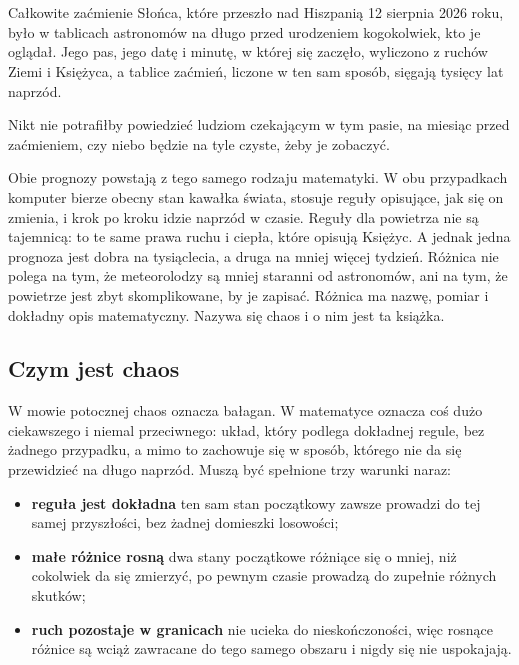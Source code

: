 
\chapter*{\lblIntroduction}
{}
\markboth{\lblIntroduction}{\lblIntroduction}

\noindent
Całkowite zaćmienie Słońca, które przeszło nad Hiszpanią 12 sierpnia 2026
roku, było w tablicach astronomów na długo przed urodzeniem kogokolwiek, kto
je oglądał. Jego pas, jego datę i minutę, w której się zaczęło, wyliczono z
ruchów Ziemi i Księżyca, a tablice zaćmień, liczone w ten sam sposób, sięgają
tysięcy lat naprzód.

Nikt nie potrafiłby powiedzieć ludziom czekającym w tym pasie, na miesiąc
przed zaćmieniem, czy niebo będzie na tyle czyste, żeby je zobaczyć.

Obie prognozy powstają z tego samego rodzaju matematyki. W obu przypadkach
komputer bierze obecny stan kawałka świata, stosuje reguły opisujące, jak się
on zmienia, i krok po kroku idzie naprzód w czasie. Reguły dla powietrza nie
są tajemnicą: to te same prawa ruchu i ciepła, które opisują Księżyc. A
jednak jedna prognoza jest dobra na tysiąclecia, a druga na mniej więcej
tydzień. Różnica nie polega na tym, że meteorolodzy są mniej staranni od
astronomów, ani na tym, że powietrze jest zbyt skomplikowane, by je
zapisać. Różnica ma nazwę, pomiar i dokładny opis matematyczny. Nazywa się
chaos i o nim jest ta książka.

\section*{Czym jest chaos}

W mowie potocznej chaos oznacza bałagan. W matematyce oznacza coś dużo
ciekawszego i niemal przeciwnego: układ, który podlega dokładnej regule, bez
żadnego przypadku, a mimo to zachowuje się w sposób, którego nie da się
przewidzieć na długo naprzód. Muszą być spełnione trzy warunki naraz:

\begin{itemize}[leftmargin=1.4em, itemsep=2pt]
  \item \textbf{reguła jest dokładna} \dash{} ten sam stan początkowy zawsze
        prowadzi do tej samej przyszłości, bez żadnej domieszki losowości;
  \item \textbf{małe różnice rosną} \dash{} dwa stany początkowe różniące się
        o mniej, niż cokolwiek da się zmierzyć, po pewnym czasie prowadzą do
        zupełnie różnych skutków;
  \item \textbf{ruch pozostaje w granicach} \dash{} nie ucieka do
        nieskończoności, więc rosnące różnice są wciąż zawracane do tego
        samego obszaru i nigdy się nie uspokajają.
\end{itemize}

